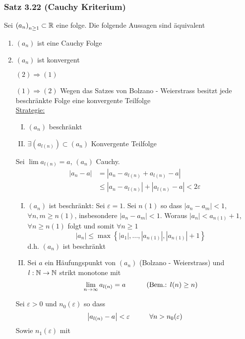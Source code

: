 \subsubsection*{Satz 3.22 (Cauchy Kriterium)}
Sei $\left( a_n\right)_{n\geq 1}\subset\mathbb{R}$ eine folge. Die folgende Aussagen sind äquivalent 
\begin{enumerate}
\item $\left( a_n\right)$ ist eine Cauchy Folge
\item $\left( a_n\right)$ ist konvergent
\end{enumerate}

\begin{beweis}{}
\begin{enumerate}[align=left]
\item[$(2)\Rightarrow(1)$]\checkmark
\item[$(1)\Rightarrow(2)$] Wegen das Satzes von Bolzano - Weierstrass besitzt jede beschränkte Folge eine konvergente Teilfolge  \\

\underline{Strategie:} 
\begin{enumerate}[I)]
\item $\left( a_n\right)$ beschränkt
\item $\exists\left( a_{l(n)}\right)\subset \left( a_n\right)$ Konvergente Teilfolge
\end{enumerate}
Sei $\lim a_{l(n)}=a$, $\left( a_n\right)$ Cauchy.
\begin{align*}
\left|a_n-a\right|&= \left| a_n-a_{l(n)}+a_{l(n)}-a\right|\\
&\leq \left| a_n-a_{l(n)} \right|+\left| a_{l(n)}-a\right| < 2\varepsilon
\end{align*}

\begin{enumerate}[I)]
\item $\left(a_n\right)$ ist beschränkt: Sei $\varepsilon=1$. Sei $n(1)$ so dass $\left| a_n-a_m\right|<1$, $\forall n,m\geq n(1)$, insbesondere $\left| a_n-a_m\right|<1$. Woraus $\left| a_n\right| < a_{n(1)}+1$, $\forall n\geq n(1)$ folgt und somit $\forall n\geq 1$ 
\[\left| {{a_n}} \right| \le \max \left\{ {\left| {{a_1}} \right|, \ldots ,\left| {{a_{n(1)}}} \right|,\left| {{a_{n(1)}}} \right| + 1} \right\}\]
d.h. $\left( a_n\right)$ ist beschränkt
\item Sei $a$ ein Häufungspunkt von $\left( a_n\right)$ (Bolzano - Weierstrass) und $l:\mathbb{N}\to\mathbb{N}$ strikt monotone mit 
\[\mathop {\lim }\limits_{n \to \infty } {a_{l(n)}} = a\hspace{10mm}\left( {{\text{Bem.: }}l(n) \ge n} \right)\]
\end{enumerate}
Sei $\varepsilon>0$ und $n_0(\varepsilon)$ so dass 
\[\left| {{a_{l(n)}} - a} \right| < \varepsilon \hspace{10mm}\forall n > {n_0}(\varepsilon )\]
Sowie $n_1(\varepsilon)$ mit \\


\end{enumerate}
\end{beweis}
